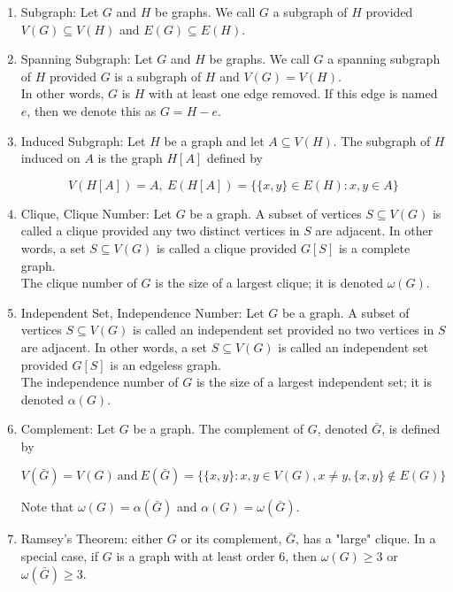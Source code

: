 \documentclass{article}
\begin{document}
\begin{enumerate}
    \item Subgraph: Let $G$ and $H$ be graphs.
    We call $G$ a subgraph of $H$ provided $V(G)\subseteq V(H)$ and $E(G)\subseteq E(H)$.
    
    \item Spanning Subgraph: Let $G$ and $H$ be graphs.
    We call $G$ a spanning subgraph of $H$ provided $G$ is a subgraph of $H$ and $V(G)=V(H)$.\\
    
    In other words, $G$ is $H$ with at least one edge removed.
    If this edge is named $e$, then we denote this as $G=H-e$.
    
    \item Induced Subgraph: Let $H$ be a graph and let $A\subseteq V(H)$.
    The subgraph of $H$ induced on $A$ is the graph $H[A]$ defined by
    
    \[V(H[A])=A, \: E(H[A])=\{\{x,y\}\in E(H): x,y\in A\}\]
    
    \item Clique, Clique Number: Let $G$ be a graph.
    A subset of vertices $S\subseteq V(G)$ is called a clique provided any two distinct vertices in $S$ are adjacent.
    In other words, a set $S\subseteq V(G)$ is called a clique provided $G[S]$ is a complete graph.\\
    
    The clique number of $G$ is the size of a largest clique;
    it is denoted $\omega (G)$.
    
    \item Independent Set, Independence Number: Let $G$ be a graph.
    A subset of vertices $S\subseteq V(G)$ is called an independent set provided no two vertices in $S$ are adjacent.
    In other words, a set $S\subseteq V(G)$ is called an independent set provided $G[S]$ is an edgeless graph.\\
    
    The independence number of $G$ is the size of a largest independent set;
    it is denoted $\alpha (G)$.
    
    \item Complement: Let $G$ be a graph.
    The complement of $G$, denoted $\bar G$, is defined by
    
    \[V(\bar G)=V(G)\: \text{and}\: E(\bar G)=\{\{x,y\}: x,y \in V(G), x\neq y, \{x,y\}\not\in E(G)\}\]
    
    Note that $\omega(G)=\alpha(\bar G)$ and $\alpha(G)=\omega(\bar G)$.
    
    \item Ramsey's Theorem: either $G$ or its complement, $\bar G$, has a "large" clique.
    In a special case, if $G$ is a graph with at least order $6$, then $\omega(G)\geq 3$ or $\omega(\bar G)\geq 3$.
    

\end{enumerate}
\end{document}
